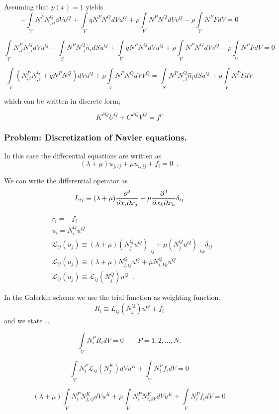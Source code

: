 Assuming that $p(x)=1$ yields
\[ - \int\limits_V N^P N_{,ii}^Q \dd{V} u^Q + \int\limits_V {q{N^P}{N^Q}dV{u^Q}}  + \rho \int\limits_V {{N^P}{N^Q}dV{v^Q}}  - \rho \int\limits_V {{N^P}FdV = 0} \]

\[\int\limits_V {N_{,i}^PN_{,i}^Q} dV{u^Q} - \int\limits_S {{N^P}N_{,i}^Q{{\hat n}_i}} dS{u^Q} + \int\limits_V {q{N^P}{N^Q}dV{u^Q}}  + \rho \int\limits_V {{N^P}{N^Q}dV{v^Q}}  - \rho \int\limits_V {{N^P}FdV = 0} \]

\[\int\limits_V {\left( {N_{,i}^PN_{,i}^Q + q{N^P}{N^Q}} \right)dV{u^Q}}  + \rho \int\limits_V {{N^P}{N^Q}dV{V^Q}}  = \int\limits_S {{N^P}N_{,i}^Q{{\hat n}_i}} dS{u^Q} + \rho \int\limits_V {{N^P}FdV} \]

which can be written in discrete form;

\[{K^{PQ}}{U^Q} + {C^{PQ}}{V^Q} = {f^p}\]



\subsubsection*{Problem: Discretization of Navier equations.}
In this case the differential equations are written as
\[(\lambda  + \mu ){u_{j,ij}} + \mu {u_{i,jj}} + {f_i} = 0 \enspace .\]

We can write the differential operator as
\[L_{ij} \equiv (\lambda  + \mu )\pdv[2]{}{x_i}{x_j} + \mu \pdv[2]{}{x_k}{x_k}\delta_{ij}\]

\begin{align*}
&r_i =  - f_i\\
&u_i = N_i^Q u^Q\\
&\mathcal{L}_{ij}(u_j) \equiv (\lambda  + \mu )(N_j^Q{u^Q})_{,ij} + \mu (N_j^Q{u^Q})_{,kk}\delta_{ij}\\
&\mathcal{L}_{ij}(u_j) \equiv (\lambda  + \mu )N_{j,ij}^Q u^Q + \mu N_{i,kk}^Q u^Q\\
&\mathcal{L}_{ij}(u_j) \equiv \mathcal{L}_{ij}(N_j^Q) u^Q \enspace .
\end{align*}

In the Galerkin scheme we use the trial function as weighting function.
\[R_i \equiv L_{ij}(N_j^Q) u^Q + f_i\]
and we state \dots

\[\int\limits_V {N_i^P{R_i}dV = 0} \quad \quad P=1,2,...,N. \]

\[\int\limits_V {N_i^P{\mathcal{L}_{ij}}(N_j^K)dV{u^K}}  + \int\limits_V {N_i^P{f_i}dV = 0} \]

\[(\lambda  + \mu )\int\limits_V {N_i^PN_{j,ij}^KdV{u^K}}  + \mu \int\limits_V {N_i^PN_{i,kk}^KdV{u^K}}  + \int\limits_V {N_i^P{f_i}dV = 0} \]

